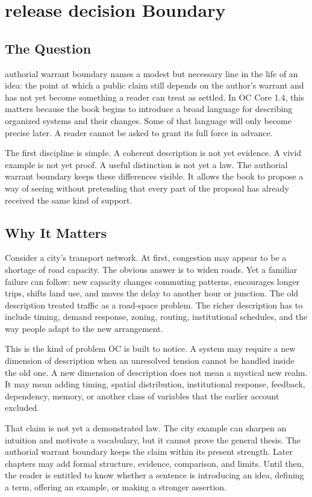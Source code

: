 \documentclass[11pt,a4paper,openany]{book}
\begin{document}
\section{release decision Boundary}
\subsection{The Question}
authorial warrant boundary names a modest but necessary line in the life of an idea: the point at which a public claim still depends on the author's warrant and has not yet become something a reader can treat as settled. In OC Core 1.4, this matters because the book begins to introduce a broad language for describing organized systems and their changes. Some of that language will only become precise later. A reader cannot be asked to grant its full force in advance. \cite{prigogine_dissipative,haken_synergetics}\par
The first discipline is simple. A coherent description is not yet evidence. A vivid example is not yet proof. A useful distinction is not yet a law. The authorial warrant boundary keeps these differences visible. It allows the book to propose a way of seeing without pretending that every part of the proposal has already received the same kind of support.\par
\subsection{Why It Matters}
Consider a city's transport network. At first, congestion may appear to be a shortage of road capacity. The obvious answer is to widen roads. Yet a familiar failure can follow: new capacity changes commuting patterns, encourages longer trips, shifts land use, and moves the delay to another hour or junction. The old description treated traffic as a road-space problem. The richer description has to include timing, demand response, zoning, routing, institutional schedules, and the way people adapt to the new arrangement. \cite{prigogine_dissipative,haken_synergetics}\par
This is the kind of problem OC is built to notice. A system may require a new dimension of description when an unresolved tension cannot be handled inside the old one. A new dimension of description does not mean a mystical new realm. It may mean adding timing, spatial distribution, institutional response, feedback, dependency, memory, or another class of variables that the earlier account excluded.\par
That claim is not yet a demonstrated law. The city example can sharpen an intuition and motivate a vocabulary, but it cannot prove the general thesis. The authorial warrant boundary keeps the claim within its present strength. Later chapters may add formal structure, evidence, comparison, and limits. Until then, the reader is entitled to know whether a sentence is introducing an idea, defining a term, offering an example, or making a stronger assertion.\par
\end{document}
